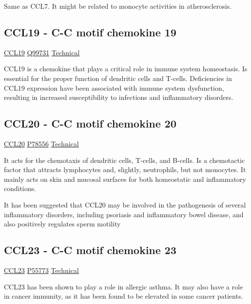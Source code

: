 Same as CCL7. It might be related to monocyte activities in atherosclerosis.

\subsection{CCL19 - C-C motif chemokine 19}

\href{https://en.wikipedia.org/wiki/CCL19}{CCL19}
\href{http://www.uniprot.org/uniprot/Q99731}{Q99731}
\href{https://olink.com/products-services/target/protein/?assayID=5052}{Technical}

CCL19 is a chemokine that plays a critical role in immune system homeostasis. Is essential for the proper function of dendritic cells and T-cells. Deficiencies in CCL19 expression have been associated with immune system dysfunction, resulting in increased susceptibility to infections and inflammatory disorders.

\subsection{CCL20 - C-C motif chemokine 20}

\href{https://en.wikipedia.org/wiki/CCL20}{CCL20}
\href{http://www.uniprot.org/uniprot/P78556}{P78556}
\href{https://olink.com/products-services/target/protein/?assayID=5116}{Technical}

It acts for the chemotaxis of dendritic cells, T-cells, and B-cells. Is a chemotactic factor that attracts lymphocytes and, slightly, neutrophils, but not monocytes. It mainly acts on skin and mucosal surfaces for both homeostatic and inflammatory conditions.

It has been suggested that CCL20 may be involved in the pathogenesis of several inflammatory disorders, including psoriasis and inflammatory bowel disease, and also positively regulates sperm motility 

\subsection{CCL23 - C-C motif chemokine 23}

\href{https://en.wikipedia.org/wiki/CCL23}{CCL23}
\href{http://www.uniprot.org/uniprot/P55773}{P55773}
\href{https://olink.com/products-services/target/protein/?assayID=5098}{Technical}

CCL23 has been shown to play a role in allergic asthma. It may also have a role in cancer immunity, as it has been found to be elevated in some cancer patients.

